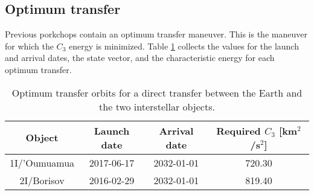 \subsection{Optimum transfer}

Previous porkchops contain an optimum transfer maneuver. This is the maneuver
for which the $C_3$ energy is minimized. Table \ref{tab:direct-transfer-optimum}
collects the values for the launch and arrival dates, the state vector, and the
characteristic energy for each optimum transfer.

\begin{table}[H]
  \centering
  \begin{tabular}{|c|c|c|c|}
    \hline
    Object & Launch date & Arrival date & Required $C_3$ [km$^2$/s$^2$] \\
    \hline
    1I/'Oumuamua & 2017-06-17 & 2032-01-01 & 720.30 \\
    2I/Borisov & 2016-02-29 & 2032-01-01 & 819.40 \\
    \hline
  \end{tabular}
  \caption{Optimum transfer orbits for a direct transfer between the Earth and the
    two interstellar objects.}
  \label{tab:direct-transfer-optimum}
\end{table}
